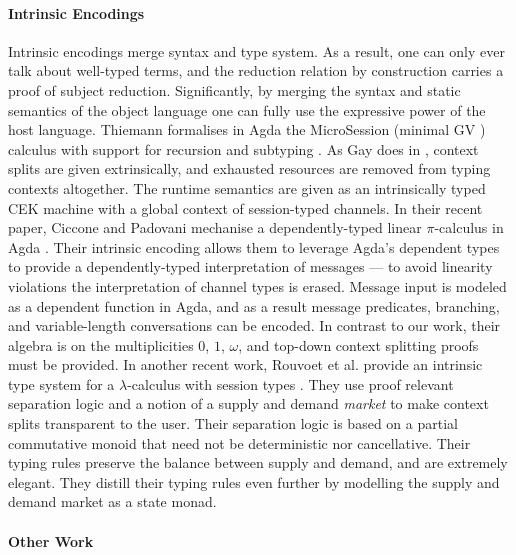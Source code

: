\documentclass[runningheads]{llncs}
\newcommand{\lambdacalc}{$\lambda$-calculus}
\newcommand{\picalc}{$\pi$-calculus}
\begin{document}
\paragraph*{Intrinsic Encodings}
 
Intrinsic encodings merge syntax and type system.
As a result, one can only ever talk about well-typed terms, and the reduction relation by construction carries a proof of subject reduction.
Significantly, by merging the syntax and static semantics of the object language one can fully use the expressive power of the host language.
%
Thiemann formalises in Agda the MicroSession (minimal GV \cite{Gay2010}) calculus with support for recursion and subtyping \cite{Thiemann2019}.
As Gay does in \cite{Gay2001}, context splits are given extrinsically, and exhausted resources are removed from typing contexts altogether.
The runtime semantics are given as an intrinsically typed CEK machine with a global context of session-typed channels.
%
In their recent paper, Ciccone and Padovani mechanise a dependently-typed linear \picalc{} in Agda \cite{Ciccone}.
Their intrinsic encoding allows them to leverage Agda's dependent types to provide a dependently-typed interpretation of messages --- to avoid linearity violations the interpretation of channel types is erased.
Message input is modeled as a dependent function in Agda, and as a result message predicates, branching, and variable-length conversations can be encoded.
In contrast to our work, their algebra is on the multiplicities $0$, $1$, $\omega$, and top-down context splitting proofs must be provided.
%
In another recent work, Rouvoet et al. provide an intrinsic type system for a \lambdacalc{} with session types \cite{Rouvoet2020}.
They use proof relevant separation logic and a notion of a supply and demand \emph{market} to make context splits transparent to the user.
Their separation logic is based on a partial commutative monoid that need not be deterministic nor cancellative.
Their typing rules preserve the balance between supply and demand, and are extremely elegant.
They distill their typing rules even further by modelling the supply and demand market as a state monad.

\paragraph*{Other Work}
\end{document}
